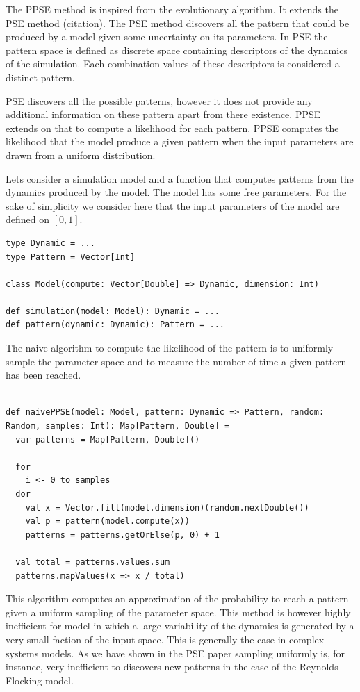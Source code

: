 \documentclass[10pt,a4paper]{article}
\theoremstyle{definition}
\theoremstyle{remark}
\begin{document}
The PPSE method is inspired from the evolutionary algorithm. It extends the PSE method (citation). The PSE method discovers all the pattern that could be produced by a model given some uncertainty on its parameters. In PSE the pattern space is defined as discrete space containing descriptors of the dynamics of the simulation. Each combination values of these descriptors is considered a distinct pattern.

PSE discovers all the possible patterns, however it does not provide any additional information on these pattern apart from there existence. PPSE extends on that to compute a likelihood for each pattern. PPSE computes the likelihood that the model produce a given pattern when the input parameters are drawn from a uniform distribution.

Lets consider a simulation model and a function that computes patterns from the dynamics produced by the model. The model has some free parameters. For the sake of simplicity we consider here that the input parameters of the model are defined on $[0, 1]$.

\begin{lstlisting}[caption={Model and pattern signatures},label={lst:pattern}]
type Dynamic = ...
type Pattern = Vector[Int]

class Model(compute: Vector[Double] => Dynamic, dimension: Int)

def simulation(model: Model): Dynamic = ...
def pattern(dynamic: Dynamic): Pattern = ...
\end{lstlisting}

The naive algorithm to compute the likelihood of the pattern is to uniformly sample the parameter space and to measure the number of time a given pattern has been reached. 

\begin{lstlisting}[caption={Naive PPSE},label={lst:pattern}]

def naivePPSE(model: Model, pattern: Dynamic => Pattern, random: Random, samples: Int): Map[Pattern, Double] = 
  var patterns = Map[Pattern, Double]()
  
  for 
    i <- 0 to samples
  dor
    val x = Vector.fill(model.dimension)(random.nextDouble())
    val p = pattern(model.compute(x))
    patterns = patterns.getOrElse(p, 0) + 1
  
  val total = patterns.values.sum
  patterns.mapValues(x => x / total)
\end{lstlisting}

This algorithm computes an approximation of the probability to reach a pattern given a uniform sampling of the parameter space. This method is however highly inefficient for model in which a large variability of the dynamics is generated by a very small faction of the input space. This is generally the case in complex systems models. As we have shown in the PSE paper sampling uniformly is, for instance, very inefficient to discovers new patterns in the case of the Reynolds Flocking model.
\end{document}
